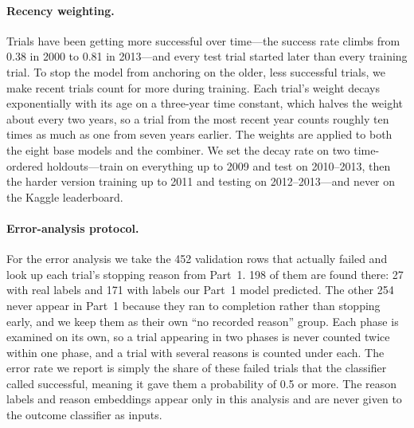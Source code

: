 \paragraph{Recency weighting.}
Trials have been getting more successful over time---the success rate climbs from
0.38 in 2000 to 0.81 in 2013---and every test trial started later than every
training trial. To stop the model from anchoring on the older, less successful
trials, we make recent trials count for more during training. Each trial's weight
decays exponentially with its age on a three-year time constant, which halves the
weight about every two years, so a trial from the most recent year counts roughly
ten times as much as one from seven years earlier. The weights are applied to both the eight base models and the combiner.
We set the decay rate on two time-ordered holdouts---train on everything up to
2009 and test on 2010--2013, then the harder version training up to 2011 and
testing on 2012--2013---and never on the Kaggle leaderboard.

\paragraph{Error-analysis protocol.}
For the error analysis we take the 452 validation rows that actually failed and
look up each trial's stopping reason from Part~1. 198 of them are found there: 27
with real labels and 171 with labels our Part~1 model predicted. The other 254
never appear in Part~1 because they ran to completion rather than stopping early,
and we keep them as their own ``no recorded reason'' group. Each phase is examined
on its own, so a trial appearing in two phases is never counted twice within one
phase, and a trial with several reasons is counted under each. The error rate we
report is simply the share of these failed trials that the classifier called
successful, meaning it gave them a probability of 0.5 or more. The reason labels
and reason embeddings appear only in this analysis and are never given to the
outcome classifier as inputs.
